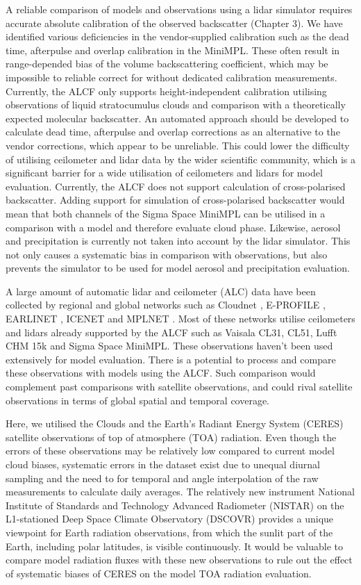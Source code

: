 A reliable comparison of models and observations using a lidar simulator
requires accurate absolute calibration of the observed backscatter
(Chapter 3). We have identified various deficiencies in the vendor-supplied
calibration such as the dead time, afterpulse and overlap calibration in
the MiniMPL. These often result in range-depended bias of the volume
backscattering coefficient, which may be impossible to reliable correct
for without dedicated calibration measurements. Currently, the ALCF only
supports height-independent calibration utilising observations of liquid
stratocumulus clouds and comparison with a theoretically expected
molecular backscatter. An automated approach should be developed to calculate
dead time, afterpulse and overlap corrections as an alternative to the 
vendor corrections, which appear to be unreliable. This could lower the
difficulty of utilising ceilometer and lidar data by the wider scientific
community, which is a significant barrier for a wide utilisation of ceilometers
and lidars for model evaluation.
Currently, the ALCF does not support calculation of cross-polarised
backscatter. Adding support for simulation of cross-polarised backscatter
would mean that both channels of the Sigma Space MiniMPL can be utilised
in a comparison with a model and therefore evaluate cloud phase.
Likewise, aerosol and precipitation is currently not taken into account
by the lidar simulator. This not only causes a systematic bias in comparison
with observations, but also prevents the simulator to be used for
model aerosol and precipitation evaluation.

A large amount of automatic lidar and ceilometer (ALC) data have been collected by regional and global
networks such as Cloudnet \citep{illingworth2007},
E-PROFILE \citep{illingworth2018}, EARLINET
\citep{pappalardo2014}, ICENET \citep{cazorla2017} and MPLNET
\citep{welton2006}. Most of these networks utilise ceilometers
and lidars already supported by the ALCF such as Vaisala CL31, CL51, Lufft CHM
15k and Sigma Space MiniMPL. These observations haven't been used
extensively for model evaluation. There is a potential to process and compare
these observations with models using the ALCF. Such comparison would complement
past comparisons with satellite observations, and could rival satellite
observations in terms of global spatial and temporal coverage. 

Here, we utilised the Clouds and the Earth's Radiant Energy System (CERES) satellite observations of top of atmosphere (TOA) radiation. Even
though the errors of these observations may be relatively low compared to 
current model cloud biases, systematic errors in the dataset exist due
to unequal diurnal sampling and the need to for temporal and angle
interpolation of the raw measurements to calculate daily averages. 
The relatively new instrument National Institute of Standards and Technology
Advanced Radiometer (NISTAR) on the L1-stationed Deep Space Climate Observatory (DSCOVR)
provides a unique viewpoint for Earth radiation observations, from which 
the sunlit part of the Earth, including polar latitudes, is visible continuously.
It would be valuable to compare model radiation fluxes with these new
observations to rule out the effect of systematic biases of CERES on the
model TOA radiation evaluation.


